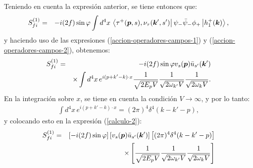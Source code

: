 Teniendo en cuenta la expresión anterior, se tiene entonces que:
\begin{eqnarray}\label{calculo-1}
S_{fi}^{(1)}&=&-i(2f)\sin\varphi\int
d^4x\,\left<\tau^+(\boldsymbol{p},s),\nu_\tau(\boldsymbol{k}',s')\right|\psi_-\bar{\psi}_-\phi_+\left|h_1^+(\boldsymbol{k})\right>,
\end{eqnarray}
y haciendo uso de las expresiones (\ref{accion-operadores-campos-1}) y (\ref{accion-operadores-campos-2}), obtenemos:
\begin{eqnarray}\label{calculo-2}
S_{fi}^{(1)}&=&-i(2f)\sin\varphi v_{s}(\boldsymbol{p})\bar{u}_{s'}(\boldsymbol{k}')\nonumber \\
& &\times \int d^4x\,e^{i(p+k'-k)\cdot
x}\frac{1}{\sqrt{2E_pV}}\frac{1}{\sqrt{2\omega_{k'}V}}\frac{1}{\sqrt{2\omega_kV}}.
\end{eqnarray}
En la integración sobre $x$, se tiene en cuenta la condición $V\rightarrow\infty$, y por lo tanto:
\begin{eqnarray*}
\int d^4x\,e^{i(p+k'-k)\cdot x}=(2\pi)^4\delta^4(k-k'-p),
\end{eqnarray*}
y colocando esto en la expresión (\ref{calculo-2}):
\begin{eqnarray}\label{calculo-3}
S_{fi}^{(1)}&=&\left[-i(2f)\sin\varphi\right]\left[v_s(\boldsymbol{p})\bar{u}_{s'}(\boldsymbol{k}')\right]\left[(2\pi)^4\delta^4(k-k'-p)\right]
 \nonumber \\
& &\times\left [ \frac { 1 } { \sqrt { 2E_pV } } \frac { 1 }{\sqrt{2\omega_{k'}V}}\frac{1}{\sqrt{2\omega_kV}}\right]
\end{eqnarray}


